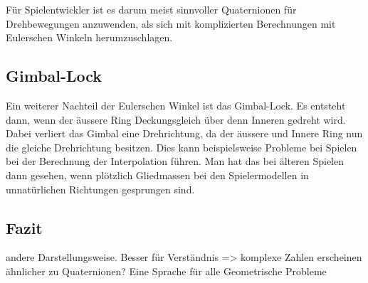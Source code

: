 Für Spielentwickler ist es darum meist sinnvoller Quaternionen für Drehbewegungen anzuwenden, als sich mit komplizierten Berechnungen mit Eulerschen Winkeln herumzuschlagen.
\subsection{Gimbal-Lock}
Ein weiterer Nachteil der Eulerschen Winkel ist das Gimbal-Lock. Es entsteht dann, wenn der äussere Ring Deckungsgleich über denn Inneren gedreht wird. Dabei verliert das Gimbal eine Drehrichtung, da der äussere und Innere Ring nun die gleiche Drehrichtung besitzen. Dies kann beispielsweise Probleme bei Spielen bei der Berechnung der Interpolation führen. Man hat das bei älteren Spielen dann gesehen, wenn plötzlich Gliedmassen bei den Spielermodellen in unnatürlichen Richtungen gesprungen sind.
\subsection{Fazit}
andere Darstellungsweise. Besser für Verständnis => komplexe Zahlen erscheinen ähnlicher zu Quaternionen? Eine Sprache für alle Geometrische Probleme